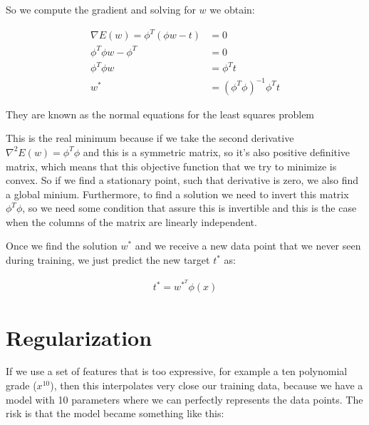 \noindent So we compute the gradient and solving for $w$ we obtain:
\begin{Equation}[H]
	\centering
	\begin{equation}
		\begin{aligned}
			\nabla E(w) = \phi^T(\phi w - t) &= 0 \\
			\phi^T \phi w - \phi^T &= 0 \\
			\phi^T \phi w &= \phi^T t \\
			w^* &= (\phi^T \phi)^{-1} \phi^T t
		\end{aligned}
	\end{equation}
	\caption[Normal equations.]{They are known as the normal equations for the least squares problem}
	\label{eq:mathmodelaada}
\end{Equation}

\noindent This is the real minimum because if we take the second derivative $ \nabla^2 E(w) = \phi^T \phi $ and this is a symmetric matrix, so it's also positive definitive matrix, which means that this objective function that we try to minimize is convex. So if we find a stationary point, such that derivative is zero, we also find a global minium. Furthermore, to find a solution we need to invert this matrix $ \phi^T \phi $, so we need some condition that assure this is invertible and this is the case when the columns of the matrix are linearly independent. 

\noindent Once we find the solution $w^*$ and we receive a new data point that we never seen during training, we just predict the new target $t^*$ as:

\begin{Equation}[H]
	\centering
	\begin{equation}
	\begin{aligned}
	t^* = w^{*^T} \phi(x)
	\end{aligned}
	\end{equation}
	\label{eq:mathmodelaada}
\end{Equation}

\section{Regularization}
\label{subsec:poverfitting}
If we use a set of features that is too expressive, for example a ten polynomial grade ($x^{10}$), then this interpolates very close our training data, because we have a model with 10 parameters where we can perfectly represents the data points. The risk is that the model became something like this:

